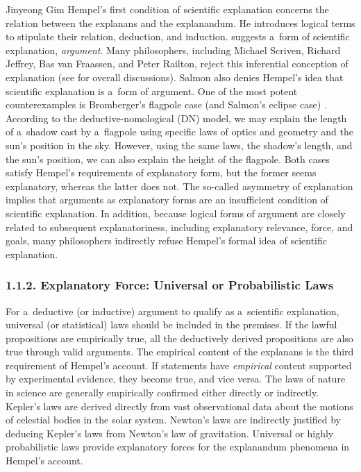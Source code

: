 \begin{artengenv}{Jinyeong Gim}
Hempel's first condition of scientific explanation concerns the relation between the explanans and the explanandum. He introduces logical terms to stipulate their relation, deduction, and induction.  
\parencite*[][pp.335–393]{hempel_aspects_1965} %
 suggests a~form of scientific explanation, \textit{argument}. Many philosophers, including Michael Scriven, Richard Jeffrey, Bas van Fraassen, and Peter Railton, reject this inferential conception of explanation
 (see \cite{salmon_four_1989} for overall discussions).
 Salmon also denies Hempel's idea that scientific explanation is a~form of argument. One of the most potent counterexamples is Bromberger's flagpole case (and Salmon's eclipse case)
\parencite[][pp.46–47]{salmon_four_1989}. %
According to the deductive-nomological (DN) model, we may explain the length of a~shadow cast by a~flagpole using specific laws of optics and geometry and the sun's position in the sky. However, using the same laws, the shadow's length, and the sun's position, we can also explain the height of the flagpole. Both cases satisfy Hempel's requirements of explanatory form, but the former seems explanatory, whereas the latter does not. The so-called asymmetry of explanation implies that arguments as explanatory forms are an insufficient condition of scientific explanation. In addition, because logical forms of argument are closely related to subsequent explanatoriness, including explanatory relevance, force, and goals, many philosophers indirectly refuse Hempel's formal idea of scientific explanation.

\subsubsection{1.1.2. Explanatory Force: Universal or Probabilistic Laws}

For a~deductive (or inductive) argument to qualify as a~scientific explanation, universal (or statistical) laws should be included in the premises. If the lawful propositions are empirically true, all the deductively derived propositions are also true through valid arguments. The empirical content of the explanans is the third requirement of Hempel's account. If statements have \textit{empirical} content supported by experimental evidence, they become true, and vice versa. The laws of nature in science are generally empirically confirmed either directly or indirectly. Kepler's laws are derived directly from vast observational data about the motions of celestial bodies in the solar system. Newton's laws are indirectly justified by deducing Kepler's laws from Newton's law of gravitation. Universal or highly probabilistic laws provide explanatory forces for the explanandum phenomena in Hempel's account.


\end{artengenv}
